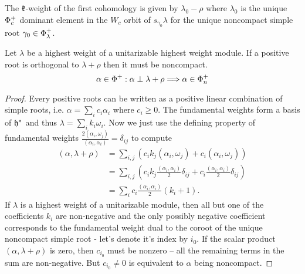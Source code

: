 \begin{remark}
 The $\mathfrak{k}$-weight of the first cohomology is given by $\lambda_0-\rho$ where $\lambda_0$ is the unique $\Phi_c^+$ dominant element in the $W_c$ orbit of $s_{\gamma_0}\lambda$ for the unique noncompact simple root $\gamma_0 \in \Phi_\lambda^+$.
\end{remark}

\begin{lemma}\label{lem:singular_are_noncompact}
 Let $\lambda$ be a highest weight of a unitarizable highest weight module. If a positive root is orthogonal to $\lambda + \rho$ then it must be noncompact.
 \[
  \alpha \in \Phi^+: \alpha \perp \lambda + \rho \Longrightarrow \alpha \in \Phi^+_n
 \]
\end{lemma}
\begin{proof}
 Every positive roots can be written as a positive linear combination of simple roots, i.e. $\alpha = \sum_i c_i \alpha_i$ where $c_i \geq 0$. The fundamental weights form a basis of $\mathfrak{h}^*$ and thus $\lambda = \sum_i k_i \omega_i$. Now we just use the defining property of fundamental weights $\frac{2(\alpha_i,\omega_j)}{(\alpha_i,\alpha_i)} = \delta_{ij}$ to compute
 \begin{align*}
  (\alpha,\lambda+\rho) & = \sum_{i,j} \left(  c_i k_j (\alpha_i,\omega_j) + c_i (\alpha_i,\omega_j) \right ) \\
			& = \sum_{i,j} \left( c_i k_j \frac{(\alpha_i,\alpha_i)}{2} \delta_{ij} + c_i \frac{(\alpha_i,\alpha_i)}{2} \delta_{ij} \right ) \\
			& = \sum_i c_i \frac{(\alpha_i,\alpha_i)}{2} (k_i + 1).
 \end{align*}
 If $\lambda$ is a highest weight of a unitarizable module, then all but one of the coefficients $k_i$ are non-negative and the only possibly negative coefficient corresponds to the fundamental weight dual to the coroot of the unique noncompact simple root - let's denote it's index by $i_0$. If the scalar product $(\alpha, \lambda+\rho)$ is zero, then $c_{i_0}$ must be nonzero -- all the remaining terms in the sum are non-negative. But $c_{i_0} \neq 0$ is equivalent to $\alpha$ being noncompact.
\end{proof}


